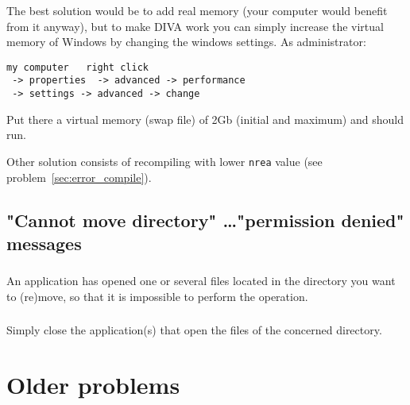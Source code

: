 \subsubsection{\answer}

The best solution would be to 
add real memory (your computer would benefit from it anyway), but to 
make DIVA work you can simply increase the virtual memory of Windows by 
changing the windows settings. As administrator:\\

\begin{verbatim}
my computer   right click
 -> properties  -> advanced -> performance
 -> settings -> advanced -> change
\end{verbatim}

Put there a virtual memory (swap file) of 2Gb (initial and maximum) and 
\diva should run. 

Other solution consists of recompiling with lower \texttt{nrea} value (see problem~\ref{sec:error_compile}).



\subsection{"Cannot move directory" \ldots "permission denied" messages}



\subsubsection{\question}

An application has opened one or several files located in the directory you want to (re)move, so that it is impossible to perform the operation.

\subsubsection{\answer}

Simply close the application(s) that open the files of the concerned directory.


\section{Older problems}


